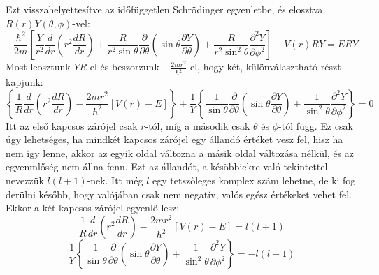 \documentclass[../main.tex]{subfiles}
\begin{document}
Ezt visszahelyettesítve az időfüggetlen Schrödinger egyenletbe, és elosztva $R(r) Y(\theta,\phi)$-vel:
\begin{equation}
    - \frac{\hbar^2}{2m} \left[ \frac{Y}{r^2} \frac{d}{d r} \left( r^2 \frac{d R}{d r} \right) + \frac{R}{r^2 \sin \theta} \frac{\partial}{\partial \theta} \left( \sin \theta \frac{\partial Y}{\partial \theta} \right) + \frac{R}{r^2 \sin^2 \theta} \frac{\partial^2 Y}{\partial \phi^2} \right] + V(r)R Y = E R Y
\end{equation}
Most leosztunk $YR$-el és beszorzunk $-\frac{2m r^2}{\hbar^2}$-el, hogy két, különválasztható részt kapjunk:
\begin{equation}
    \left\{\frac{1}{R} \frac{d}{dr} \left(r^2 \frac{d R}{d r} \right) - \frac{2 m r^2}{\hbar^2} [V(r) - E]\right\} + \frac{1}{Y} \left\{\frac{1}{\sin \theta} \frac{\partial}{\partial \theta} \left( \sin \theta \frac{\partial Y}{\partial \theta} \right) + \frac{1}{\sin^2 \theta} \frac{\partial^2 Y}{\partial \phi^2}\right\} = 0
\end{equation}
Itt az első kapcsos zárójel csak $r$-tól, míg a második csak $\theta$ és $\phi$-tól függ. Ez csak úgy lehetséges, ha mindkét kapcsos zárójel egy állandó értéket vesz fel, hisz ha nem így lenne, akkor az egyik oldal változna a másik oldal változása nélkül, és az egyenmlőség nem állna fenn.
Ezt az állandót, a késöbbiekre való tekintettel nevezzük $l(l+1)$-nek. Itt még $l$ egy tetszőleges komplex szám lehetne, de ki fog derülni később, hogy valójában csak nem negatív, valós egész értékeket vehet fel. Ekkor a két kapcsos zárójel egyenlő lesz:
\begin{equation}
    \frac{1}{R} \frac{d}{dr} \left(r^2 \frac{d R}{d r} \right) - \frac{2 m r^2}{\hbar^2} [V(r) - E] = l(l+1)
\end{equation}
\begin{equation}
    \frac{1}{Y} \left\{\frac{1}{\sin \theta} \frac{\partial}{\partial \theta} \left( \sin \theta \frac{\partial Y}{\partial \theta} \right) + \frac{1}{\sin^2 \theta} \frac{\partial^2 Y}{\partial \phi^2}\right\} = - l(l+1)
\end{equation}
\end{document}

